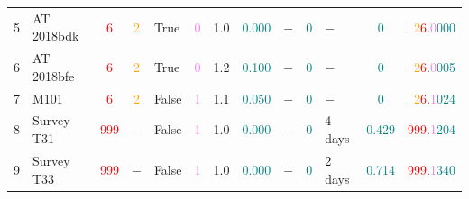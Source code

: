 \begin{colsection}
\begin{colsection}
\begin{table}
\begin{center}
\begin{tabular}{clcclclclclcr}
5 &
AT 2018bdk &
\textcolor{red}{6} &
\textcolor{orange}{2} &
True   & \textcolor{violet}{0}   &
1.0    & \textcolor{teal}{0.000} &
$-$    & \textcolor{teal}{0}     &
$-$    & \textcolor{teal}{0}     &
\textcolor{orange}{~2}\textcolor{red}{6}.\textcolor{violet}{0}\textcolor{teal}{000} \\

6 &
AT 2018bfe &
\textcolor{red}{6} &
\textcolor{orange}{2} &
True   & \textcolor{violet}{0}   &
1.2    & \textcolor{teal}{0.100} &
$-$    & \textcolor{teal}{0}     &
$-$    & \textcolor{teal}{0}     &
\textcolor{orange}{~2}\textcolor{red}{6}.\textcolor{violet}{0}\textcolor{teal}{005} \\

7 &
M101 &
\textcolor{red}{6} &
\textcolor{orange}{2} &
False  & \textcolor{violet}{1}   &
1.1    & \textcolor{teal}{0.050} &
$-$    & \textcolor{teal}{0}     &
$-$    & \textcolor{teal}{0}     &
\textcolor{orange}{~2}\textcolor{red}{6}.\textcolor{violet}{1}\textcolor{teal}{024} \\

8 &
Survey T31 &
\textcolor{red}{999} &
$-$ &
False  & \textcolor{violet}{1}   &
1.0    & \textcolor{teal}{0.000} &
$-$    & \textcolor{teal}{0}     &
4 days & \textcolor{teal}{0.429} &
\textcolor{orange}{}\textcolor{red}{999}.\textcolor{violet}{1}\textcolor{teal}{204} \\

9 &
Survey T33 &
\textcolor{red}{999} &
$-$                   &
False  & \textcolor{violet}{1}   &
1.0    & \textcolor{teal}{0.000} &
$-$    & \textcolor{teal}{0}     &
2 days & \textcolor{teal}{0.714} &
\textcolor{orange}{}\textcolor{red}{999}.\textcolor{violet}{1}\textcolor{teal}{340} \\

\midrule
\end{tabular}
\end{center}
\end{table}


\end{colsection}
\end{colsection}
